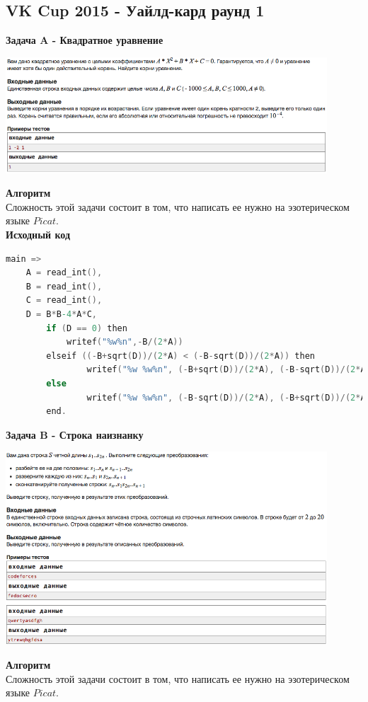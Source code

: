 \documentclass[a4paper,12pt]{article}
\begin{document}
%
%

\newpage
\subsection{ VK Cup 2015 - Уайлд-кард раунд 1}

\textbf{{\large Задача A - Квадратное уравнение}} \\
\begin{center}
\includegraphics[width=0.9\textwidth]{VK_1/VK_1_A.png}\\ [1cm]
\end{center}
\textbf{{\large Алгоритм}} \\
Сложность этой задачи состоит в том, что написать ее нужно на эзотерическом языке $Picat$.\\

\textbf{{\large Исходный код}}
\begin{lstlisting}[language=C]
main =>
    A = read_int(),
    B = read_int(),
    C = read_int(),
    D = B*B-4*A*C,
        if (D == 0) then
            writef("%w%n",-B/(2*A))
        elseif ((-B+sqrt(D))/(2*A) < (-B-sqrt(D))/(2*A)) then
                writef("%w %w%n", (-B+sqrt(D))/(2*A), (-B-sqrt(D))/(2*A))
        else
                writef("%w %w%n", (-B-sqrt(D))/(2*A), (-B+sqrt(D))/(2*A))
        end.
\end{lstlisting}
\newpage
\textbf{{\large Задача B - Строка наизнанку}} \\
\begin{center}
\includegraphics[width=0.9\textwidth]{VK_1/VK_1_B.png}\\ [1cm]
\end{center}
\textbf{{\large Алгоритм}} \\
Сложность этой задачи состоит в том, что написать ее нужно на эзотерическом языке $Picat$.\\
\end{document}
